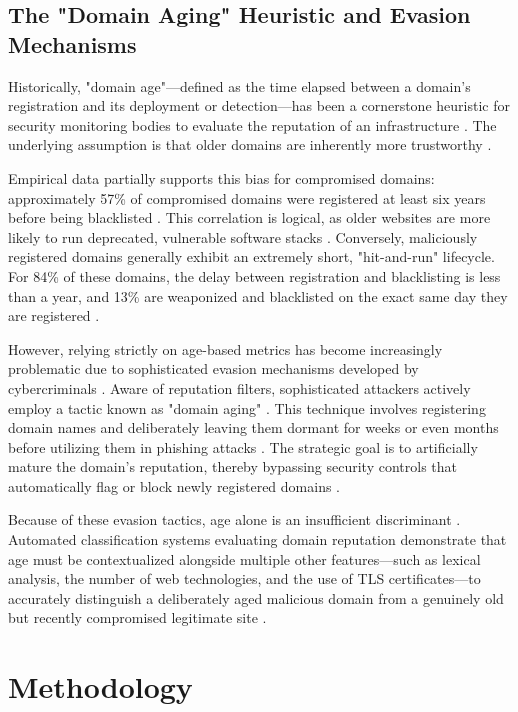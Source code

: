 \documentclass[final, 9pt, twocolumn]{saucis}
\begin{document}
\subsection{The "Domain Aging" Heuristic and Evasion Mechanisms}
Historically, "domain age"—defined as the time elapsed between a domain's registration and its deployment or detection—has been a cornerstone heuristic for security monitoring bodies to evaluate the reputation of an infrastructure \cite{comar_classification, comar_evasion}. The underlying assumption is that older domains are inherently more trustworthy \cite{comar_aging}. 

Empirical data partially supports this bias for compromised domains: approximately 57\% of compromised domains were registered at least six years before being blacklisted \cite{comar_aging}. This correlation is logical, as older websites are more likely to run deprecated, vulnerable software stacks \cite{comar_aging}. Conversely, maliciously registered domains generally exhibit an extremely short, "hit-and-run" lifecycle. For 84\% of these domains, the delay between registration and blacklisting is less than a year, and 13\% are weaponized and blacklisted on the exact same day they are registered \cite{comar_aging}. 

However, relying strictly on age-based metrics has become increasingly problematic due to sophisticated evasion mechanisms developed by cybercriminals \cite{comar_evasion}. Aware of reputation filters, sophisticated attackers actively employ a tactic known as "domain aging" \cite{comar_evasion}. This technique involves registering domain names and deliberately leaving them dormant for weeks or even months before utilizing them in phishing attacks \cite{comar_evasion}. The strategic goal is to artificially mature the domain's reputation, thereby bypassing security controls that automatically flag or block newly registered domains \cite{comar_evasion}. 

Because of these evasion tactics, age alone is an insufficient discriminant \cite{comar_evasion}. Automated classification systems evaluating domain reputation demonstrate that age must be contextualized alongside multiple other features—such as lexical analysis, the number of web technologies, and the use of TLS certificates—to accurately distinguish a deliberately aged malicious domain from a genuinely old but recently compromised legitimate site \cite{comar_classification, comar_aging}.


\section{Methodology}
\end{document}
